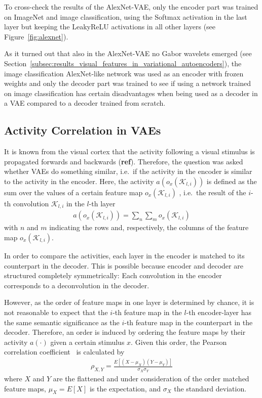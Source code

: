 To cross-check the results of the AlexNet-VAE, only the encoder part was trained on ImageNet and image classification, using the Softmax activation in the last layer but keeping the \ac{LeakyReLU} activations in all other layers (see Figure~\ref{fig:alexnet}).

As it turned out that also in the AlexNet-VAE no Gabor wavelets emerged (see Section~\ref{subsec:results_visual_features_in_variational_autoencoders}), the image classification AlexNet-like network was used as an encoder with frozen weights and only the decoder part was trained to see if using a network trained on image classification has certain disadvantages when being used as a decoder in a \ac{VAE} compared to a decoder trained from scratch.

\subsection{Activity Correlation in \acp{VAE}}\label{subsec:activity-correlation-in-vaes}

It is known from the visual cortex that the activity following a visual stimulus is propagated forwards and backwards (\textbf{ref}).
Therefore, the question was asked whether \acp{VAE} do something similar, i.e.\ if the activity in the encoder is similar to the activity in the encoder.
Here, the activity $a(o_x(\mathcal{K}_{l,i}))$ is defined as the sum over the values of a certain feature map $o_x(\mathcal{K}_{l,i})$ , i.e.\ the result of the $i$-th convolution $\mathcal{K}_{l,i}$ in the $l$-th layer
\begin{align}
    a(o_x(\mathcal{K}_{l,i})) = \sum_n \sum_m o_x(\mathcal{K}_{l,i})
\end{align}
with $n$ and $m$ indicating the rows and, respectively, the columns of the feature map $o_x(\mathcal{K}_{l,i})$.

In order to compare the activities, each layer in the encoder is matched to its counterpart in the decoder.
This is possible because encoder and decoder are structured completely symmetrically: Each convolution in the encoder corresponds to a deconvolution in the decoder.

However, as the order of feature maps in one layer is determined by chance, it is not reasonable to expect that the $i$-th feature map in the $l$-th encoder-layer has the same semantic significance as the $i$-th feature map in the counterpart in the decoder.
Therefore, an order is induced by ordering the feature maps by their activity $a(\cdot)$ given a certain stimulus $x$.
Given this order, the Pearson correlation coefficient~\citep{freedman2007statistics} is calculated by
\begin{align}
    \rho_{X, Y} = \frac{E[(X- \mu_X)(Y- \mu_Y)]}{\sigma_X \sigma_Y}
\end{align}
where $X$ and $Y$ are the flattened and under consideration of the order matched feature maps, $\mu_X = E[X]$ is the expectation, and $\sigma_X$ the standard deviation.
